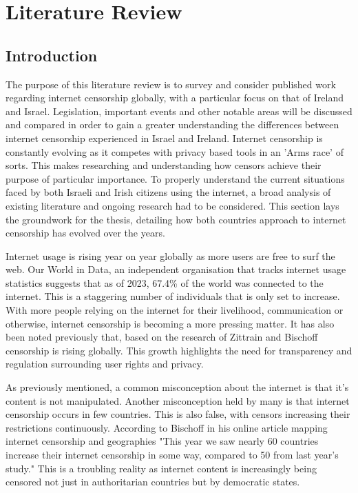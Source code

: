 \chapter{Literature Review}

\section{Introduction}

The purpose of this literature review is to survey and consider published work regarding internet censorship globally, with a particular focus on that of Ireland and Israel. Legislation, important events and other notable areas will be discussed and compared in order to gain a greater understanding the differences between internet censorship experienced in Israel and Ireland. Internet censorship is constantly evolving as it competes with privacy based tools in an 'Arms race' of sorts. This makes researching and understanding how censors achieve their purpose of particular importance. To properly understand the current situations faced by both Israeli and Irish citizens using the internet, a broad analysis of existing literature and ongoing research had to be considered. This section lays the groundwork for the thesis, detailing how both countries approach to internet censorship has evolved over the years. 

Internet usage is rising year on year globally as more users are free to surf the web. Our World in Data, an independent organisation that tracks internet usage statistics suggests that as of 2023, 67.4\% of the world was connected to the internet. \cite{owid-internet} This is a staggering number of individuals that is only set to increase. With more people relying on the internet for their livelihood, communication or otherwise, internet censorship is becoming a more pressing matter. It has also been noted previously that, based on the research of Zittrain \cite{zittrain2017shifting} and Bischoff \cite{bischoff2025internet} censorship is rising globally. This growth highlights the need for transparency and regulation surrounding user rights and privacy. 

As previously mentioned, a common misconception about the internet is that it's content is not manipulated. Another misconception held by many is that internet censorship occurs in few countries. This is also false, with censors increasing their restrictions continuously. According to Bischoff in his online article mapping internet censorship and geographies "This year we saw nearly 60 countries increase their internet censorship in some way, compared to 50 from last year’s study."\cite{bischoff2025internet} This is a troubling reality as internet content is increasingly being censored not just in authoritarian countries but by democratic states. 

